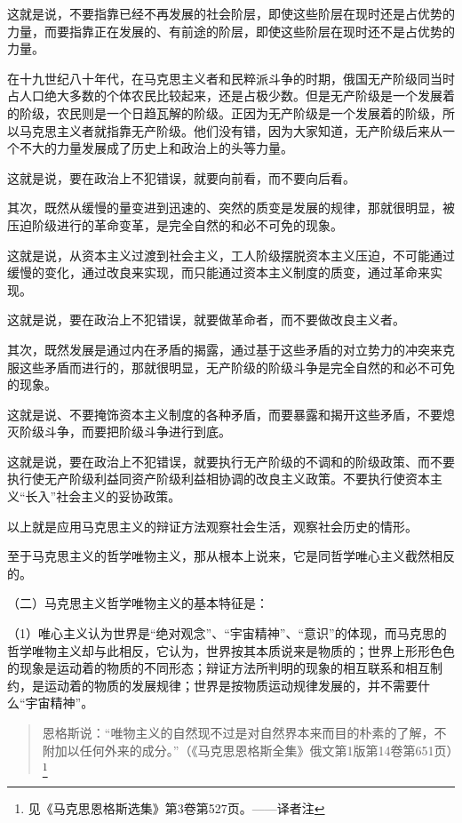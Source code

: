 这就是说，不要指靠已经不再发展的社会阶层，即使这些阶层在现时还是占优势的力量，而要指靠正在发展的、有前途的阶层，即使这些阶层在现时还不是占优势的力量。

在十九世纪八十年代，在马克思主义者和民粹派斗争的时期，俄国无产阶级同当时占人口绝大多数的个体农民比较起来，还是占极少数。但是无产阶级是一个发展着的阶级，农民则是一个日趋瓦解的阶级。正因为无产阶级是一个发展着的阶级，所以马克思主义者就指靠无产阶级。他们没有错，因为大家知道，无产阶级后来从一个不大的力量发展成了历史上和政治上的头等力量。

这就是说，要在政治上不犯错误，就要向前看，而不要向后看。

其次，既然从缓慢的量变进到迅速的、突然的质变是发展的规律，那就很明显，被压迫阶级进行的革命变革，是完全自然的和必不可免的现象。

这就是说，从资本主义过渡到社会主义，工人阶级摆脱资本主义压迫，不可能通过缓慢的变化，通过改良来实现，而只能通过资本主义制度的质变，通过革命来实现。

这就是说，要在政治上不犯错误，就要做革命者，而不要做改良主义者。

其次，既然发展是通过内在矛盾的揭露，通过基于这些矛盾的对立势力的冲突来克服这些矛盾而进行的，那就很明显，无产阶级的阶级斗争是完全自然的和必不可免的现象。

这就是说、不要掩饰资本主义制度的各种矛盾，而要暴露和揭开这些矛盾，不要熄灭阶级斗争，而要把阶级斗争进行到底。

这就是说，要在政治上不犯错误，就要执行无产阶级的不调和的阶级政策、而不要执行使无产阶级利益同资产阶级利益相协调的改良主义政策。不要执行使资本主义“长入”社会主义的妥协政策。

以上就是应用马克思主义的辩证方法观察社会生活，观察社会历史的情形。

至于马克思主义的哲学唯物主义，那从根本上说来，它是同哲学唯心主义截然相反的。

（二）马克思主义哲学唯物主义的基本特征是：

（1）唯心主义认为世界是“绝对观念”、“宇宙精神”、“意识”的体现，而马克思的哲学唯物主义却与此相反，它认为，世界按其本质说来是物质的；世界上形形色色的现象是运动着的物质的不同形态；辩证方法所判明的现象的相互联系和相互制约，是运动着的物质的发展规律；世界是按物质运动规律发展的，并不需要什么“宇宙精神”。

\begin{quotation}
恩格斯说：“唯物主义的自然现不过是对自然界本来而目的朴素的了解，不附加以任何外来的成分。”（《马克思恩格斯全集》俄文第1版第14卷第651页）\footnote{见《马克思恩格斯选集》第3卷第527页。——译者注}
\end{quotation}

